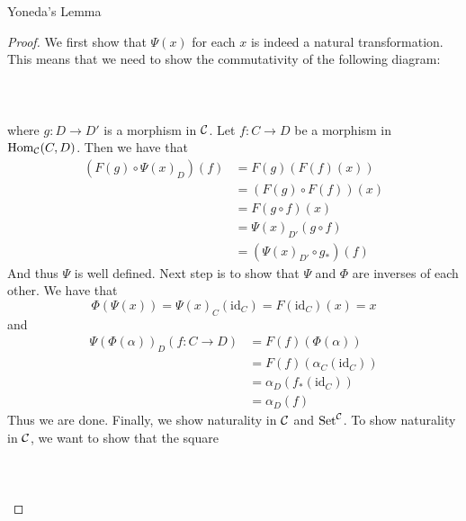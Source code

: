\documentclass[a4paper]{article}
\begin{document}
\begin{thm}{Yoneda's Lemma}{}
\begin{proof}
We first show that $\Psi(x)$ for each $x$ is indeed a natural transformation. This means that we need to show the commutativity of the following diagram: \\~\\
\\~\\
where $g:D\to D'$ is a morphism in $\mathcal{C}$. Let $f:C\to D$ be a morphism in $\operatorname{Hom}_{\mathcal{C}}(C,D)$. Then we have that 
\begin{align*}
(F(g)\circ\Psi(x)_D)(f)&=F(g)(F(f)(x))\\
&=(F(g)\circ F(f))(x)\\
&=F(g\circ f)(x)\\
&=\Psi(x)_{D'}(g\circ f)\\
&=(\Psi(x)_{D'}\circ g_\ast)(f)
\end{align*}
And thus $\Psi$ is well defined. Next step is to show that $\Psi$ and $\Phi$ are inverses of each other. We have that $$\Phi(\Psi(x))=\Psi(x)_C(\text{id}_C)=F(\text{id}_C)(x)=x$$ and 
\begin{align*}
\Psi(\Phi(\alpha))_D(f:C\to D)&=F(f)(\Phi(\alpha))\\
&=F(f)(\alpha_C(\text{id}_C))\\
&=\alpha_D(f_\ast(\text{id}_C))\\
&=\alpha_D(f)
\end{align*}
Thus we are done. Finally, we show naturality in $\mathcal{C}$ and $\text{Set}^{\mathcal{C}}$. To show naturality in $\mathcal{C}$, we want to show that the square \\~\\
\\~\\

\end{proof}
\end{thm}
\end{document}
